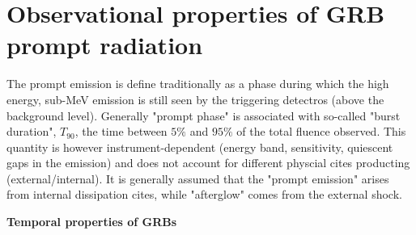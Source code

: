 
\section{Observational properties of GRB prompt radiation}



The prompt emission is define traditionally as a phase during which the high energy, sub-MeV emission is still seen by the triggering detectros (above the background level). 
Generally "prompt phase" is associated with so-called "burst duration", $T_{90}$, the time between $5\%$ and $95\%$ of the total fluence observed. This quantity is however instrument-dependent (energy band, sensitivity, quiescent gaps in the emission) and does not account for different physcial cites producting (external/internal). It is generally assumed that the "prompt emission" arises from internal dissipation cites, while "afterglow" comes from the external shock. 

\textbf{Temporal properties of GRBs}

